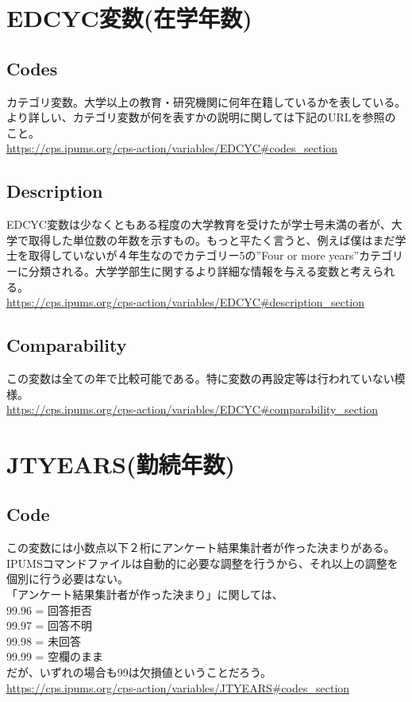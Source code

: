 \documentclass{jsarticle}
\begin{document}
\section{EDCYC変数(在学年数)}

\subsection{Codes}
カテゴリ変数。大学以上の教育・研究機関に何年在籍しているかを表している。より詳しい、カテゴリ変数が何を表すかの説明に関しては下記のURLを参照のこと。\\
\url{https://cps.ipums.org/cps-action/variables/EDCYC#codes_section}

\subsection{Description}
EDCYC変数は少なくともある程度の大学教育を受けたが学士号未満の者が、大学で取得した単位数の年数を示すもの。もっと平たく言うと、例えば僕はまだ学士を取得していないが４年生なのでカテゴリー5の”Four or more years”カテゴリーに分類される。大学学部生に関するより詳細な情報を与える変数と考えられる。\\
\url{https://cps.ipums.org/cps-action/variables/EDCYC#description_section}

\subsection{Comparability}
この変数は全ての年で比較可能である。特に変数の再設定等は行われていない模様。\\
\url{https://cps.ipums.org/cps-action/variables/EDCYC#comparability_section}

\section{JTYEARS(勤続年数)}

\subsection{Code}
この変数には小数点以下２桁にアンケート結果集計者が作った決まりがある。IPUMSコマンドファイルは自動的に必要な調整を行うから、それ以上の調整を個別に行う必要はない。\\
  
「アンケート結果集計者が作った決まり」に関しては、\\
99.96 = 回答拒否\\
99.97 = 回答不明\\
99.98 = 未回答\\
99.99 = 空欄のまま\\
だが、いずれの場合も99は欠損値ということだろう。\\
\url{https://cps.ipums.org/cps-action/variables/JTYEARS#codes_section}
\end{document}
